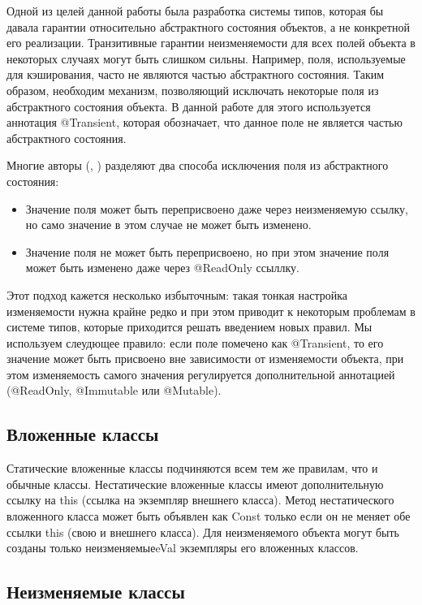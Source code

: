 Одной из целей данной работы была разработка системы типов, которая бы давала гарантии относительно абстрактного состояния объектов, а не конкретной его реализации. Транзитивные гарантии неизменяемости для всех полей объекта в некоторых случаях могут быть слишком сильны. Например, поля, используемые для кэширования, часто не являются частью абстрактного состояния. Таким образом, необходим механизм, позволяющий исключать некоторые поля из абстрактного состояния объекта. В данной работе для этого используется аннотация @Transient, которая обозначает, что данное поле не является частью абстрактного состояния. 

Многие авторы (\cite{Zibin2007}, \cite{Tschantz2006}) разделяют два способа исключения поля из абстрактного состояния:
\begin{itemize}
\item{Значение поля может быть переприсвоено даже через неизменяемую ссылку, но само значение в этом случае не может быть изменено.}
\item{Значение поля не может быть переприсвоено, но при этом значение поля может быть изменено даже через @ReadOnly ссыллку.}
\end{itemize}
Этот подход кажется несколько избыточным: такая тонкая настройка изменяемости нужна крайне редко и при этом приводит к некоторым проблемам в системе типов, которые приходится решать введением новых правил. Мы используем слеудющее правило: если поле помечено как @Transient, то его значение может быть присвоено вне зависимости от изменяемости объекта, при этом изменяемость самого значения регулируется дополнительной аннотацией (@ReadOnly, @Immutable или @Mutable).

\subsection{Вложенные классы}

Статические вложенные классы подчиняются всем тем же правилам, что и обычные классы. Нестатические вложенные классы имеют дополнительную ссылку на this (ссылка на экземпляр внешнего класса). Метод нестатического вложенного класса может быть объявлен как Const только если он не меняет обе ссылки this (свою и внешнего класса). Для неизменяемого объекта могут быть созданы только неизменяемыеeVal экземпляры его вложенных классов. 

\subsection{Неизменяемые классы}

